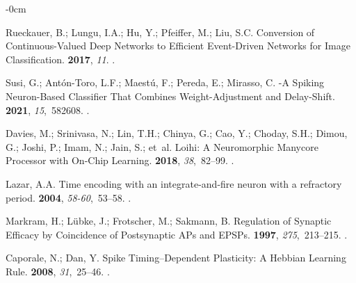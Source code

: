 \documentclass[brainsci, %
               review,submit,pdftex,moreauthors
               ]{Definitions/mdpi}
\begin{document}
\begin{adjustwidth}{-\extralength}{0cm}
\begin{thebibliography}{999}
  Rueckauer, B.; Lungu, I.A.; Hu, Y.; Pfeiffer, M.; Liu, S.C.
  \newblock Conversion of {Continuous}-{Valued} {Deep} {Networks} to {Efficient}
    {Event}-{Driven} {Networks} for {Image} {Classification}.
   {\bf 2017}, {\em 11}.
  .
  
  Susi, G.; Antón-Toro, L.F.; Maestú, F.; Pereda, E.; Mirasso, C.
  -{A} {Spiking} {Neuron}-{Based} {Classifier} {That} {Combines}
    {Weight}-{Adjustment} and {Delay}-{Shift}.
   {\bf 2021}, {\em 15},~582608.
  .
  
  Davies, M.; Srinivasa, N.; Lin, T.H.; Chinya, G.; Cao, Y.; Choday, S.H.; Dimou,
    G.; Joshi, P.; Imam, N.; Jain, S.;  et~al.
  \newblock Loihi: {A} {Neuromorphic} {Manycore} {Processor} with {On}-{Chip}
    {Learning}.
   {\bf 2018}, {\em 38},~82--99.
  .
  
  Lazar, A.A.
  \newblock Time encoding with an integrate-and-fire neuron with a refractory
    period.
   {\bf 2004}, {\em 58-60},~53--58.
  .
  
  Markram, H.; Lübke, J.; Frotscher, M.; Sakmann, B.
  \newblock Regulation of {Synaptic} {Efficacy} by {Coincidence} of
    {Postsynaptic} {APs} and {EPSPs}.
   {\bf 1997}, {\em 275},~213--215.
  .
  
  Caporale, N.; Dan, Y.
  \newblock Spike {Timing}–{Dependent} {Plasticity}: {A} {Hebbian} {Learning}
    {Rule}.
   {\bf 2008}, {\em 31},~25--46.
  .
  

\end{thebibliography}
\end{adjustwidth}
\end{document}

